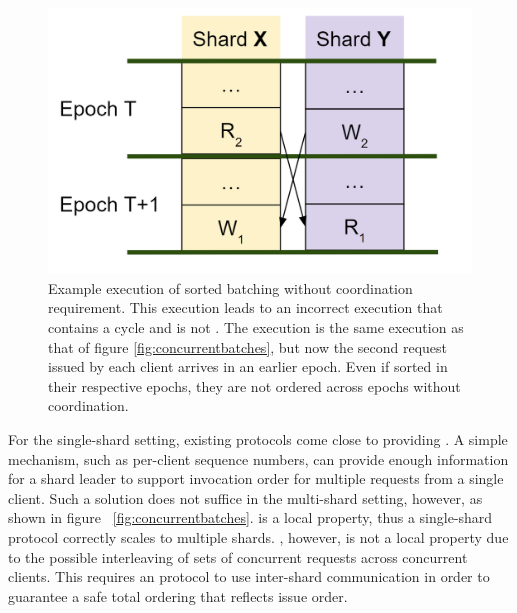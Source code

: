 \begin{figure}[!htb]
\includegraphics[scale=.3]{sorted_batching_wrong.png}
\caption{Example execution of sorted batching without coordination requirement. This execution leads to an incorrect execution that contains a cycle and is not \mdl. The execution is the same execution as that of figure \ref{fig:concurrentbatches}, but now the second request issued by each client arrives in an earlier epoch. Even if sorted in their respective epochs, they are not ordered across epochs without coordination.}
\label{fig:sortedbatchingwrong}
\end{figure}

For the single-shard setting, existing protocols come close to providing \mdl. A simple mechanism, such as per-client sequence numbers, can provide enough information for a shard leader to support invocation order for multiple requests from a single client. Such a solution does not suffice in the multi-shard setting, however, as shown in figure ~\ref{fig:concurrentbatches}. \sdl is a local property, thus a single-shard protocol correctly scales to multiple shards.  \mdl, however, is not a local property due to the possible interleaving of sets of concurrent requests across concurrent clients. This requires an \md protocol to use inter-shard communication in order to guarantee a safe total ordering that reflects issue order.
